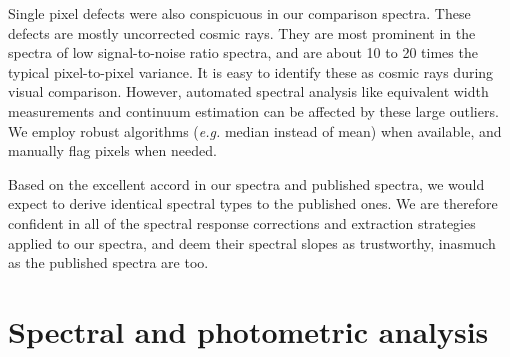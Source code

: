 Single pixel defects were also conspicuous in our comparison spectra.  These defects are mostly uncorrected cosmic rays.  They are most prominent in the spectra of low signal-to-noise ratio spectra, and are about 10 to 20 times the typical pixel-to-pixel variance.  It is easy to identify these as cosmic rays during visual comparison.  However, automated spectral analysis like equivalent width measurements and continuum estimation can be affected by these large outliers.  We employ robust algorithms (\emph{e.g.} median instead of mean) when available, and manually flag pixels when needed.

Based on the excellent accord in our spectra and published spectra, we would expect to derive identical spectral types to the published ones.  We are therefore confident in all of the spectral response corrections and extraction strategies applied to our spectra, and deem their spectral slopes as trustworthy, inasmuch as the published spectra are too.


\section{Spectral and photometric analysis}

